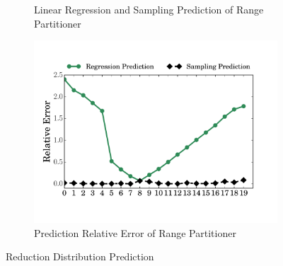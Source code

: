 \begin{figure}
\begin{subfigure}[b]{0.31\linewidth}
		\caption{Linear Regression and Sampling Prediction of Range Partitioner}
		\label{fig:range_pre_sample}
		\vspace{1em}
	\end{subfigure}
	\begin{subfigure}[b]{0.31\linewidth}
		\includegraphics[width=\linewidth]{fig/prediction_relative_error}
		\caption{Prediction Relative Error of Range Partitioner\newline}
		\label{fig:prediction_relative_error}
	\end{subfigure}
	\caption{Reduction Distribution Prediction}
	\label{fig:dis}
	\vspace{-1em}
\end{figure}

